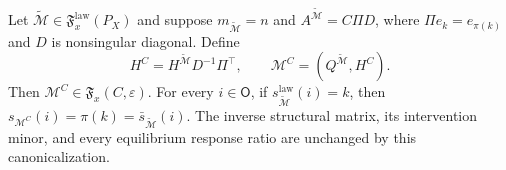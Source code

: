 Let \(\widetilde{\mathcal M}\in\mathfrak F_x^{\mathrm{law}}(P_X)\) and suppose \(m_{\widetilde{\mathcal M}}=n\) and \(A^{\widetilde{\mathcal M}}=C\Pi D\), where \(\Pi e_k=e_{\pi(k)}\) and \(D\) is nonsingular diagonal. Define
\[
 H^C=H^{\widetilde{\mathcal M}}D^{-1}\Pi^\top,
 \qquad
 \mathcal M^C=(Q^{\widetilde{\mathcal M}},H^C).
\]
Then \(\mathcal M^C\in\mathfrak F_x(C,\varepsilon)\). For every \(i\in\mathsf O\), if \(s_{\widetilde{\mathcal M}}^{\mathrm{law}}(i)=k\), then \(s_{\mathcal M^C}(i)=\pi(k)=\bar s_{\widetilde{\mathcal M}}(i)\). The inverse structural matrix, its intervention minor, and every equilibrium response ratio are unchanged by this canonicalization.
